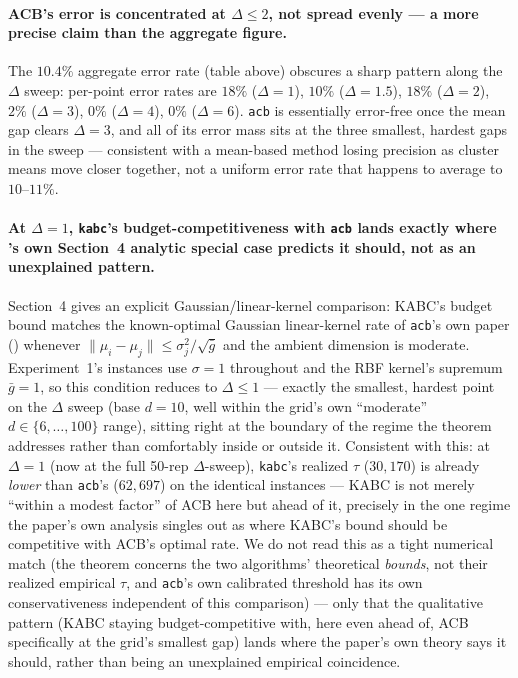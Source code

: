 \documentclass[11pt]{article}
\begin{document}
\paragraph{ACB's error is concentrated at $\Delta\le 2$, not spread evenly
--- a more precise claim than the aggregate figure.} The $10.4\%$ aggregate
error rate (table above) obscures a sharp pattern along the $\Delta$
sweep: per-point error rates are $18\%$ ($\Delta=1$), $10\%$ ($\Delta=1.5$),
$18\%$ ($\Delta=2$), $2\%$ ($\Delta=3$), $0\%$ ($\Delta=4$), $0\%$
($\Delta=6$). \texttt{acb} is essentially error-free once the mean gap
clears $\Delta=3$, and all of its error mass sits at the three smallest,
hardest gaps in the sweep --- consistent with a mean-based method losing
precision as cluster means move closer together, not a uniform
error rate that happens to average to $10$--$11\%$.

\paragraph{At $\Delta=1$, \texttt{kabc}'s budget-competitiveness with
\texttt{acb} lands exactly where \cite{kabc2026}'s own Section~4 analytic
special case predicts it should, not as an unexplained pattern.} Section~4
gives an explicit Gaussian/linear-kernel comparison: KABC's budget bound
matches the known-optimal Gaussian linear-kernel rate of \texttt{acb}'s
own paper (\cite{acb2024}) whenever $\|\mu_i-\mu_j\|\le\sigma_j^2/\sqrt{\bar
g}$ and the ambient dimension is moderate. Experiment~1's instances use
$\sigma=1$ throughout and the RBF kernel's supremum $\bar g=1$, so this
condition reduces to $\Delta\le 1$ --- exactly the smallest, hardest point
on the $\Delta$ sweep (base $d=10$, well within the grid's own
``moderate'' $d\in\{6,\ldots,100\}$ range), sitting right at the boundary
of the regime the theorem addresses rather than comfortably inside or
outside it. Consistent with this: at $\Delta=1$ (now at the full 50-rep
$\Delta$-sweep), \texttt{kabc}'s realized $\tau$ ($30{,}170$) is already
\emph{lower} than \texttt{acb}'s ($62{,}697$) on the identical instances
--- KABC is not merely ``within a modest factor'' of ACB here but ahead of
it, precisely in the one regime the paper's own analysis singles out as
where KABC's bound should be competitive with ACB's optimal rate. We do
not read this as a tight numerical match (the theorem concerns the two
algorithms' theoretical \emph{bounds}, not their realized empirical
$\tau$, and \texttt{acb}'s own calibrated threshold has its own
conservativeness independent of this comparison) --- only that the
qualitative pattern (KABC staying budget-competitive with, here even
ahead of, ACB specifically at the grid's smallest gap) lands where the
paper's own theory says it should, rather than being an unexplained
empirical coincidence.
\end{document}

